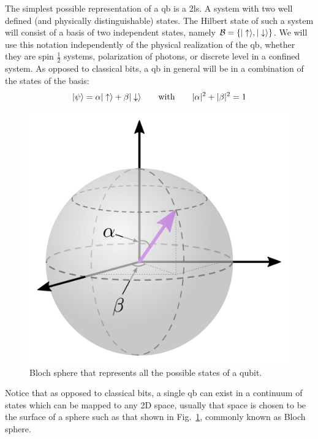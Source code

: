 
The simplest possible representation of a \ac{qb} is a \ac{2ls}. A system with two well defined (and physically distinguishable) states. The Hilbert state of such a system will consist of a basis of two independent states, namely $\mathcal{B}=\{|\uparrow\rangle,|\downarrow\rangle\}$. We will use this notation independently of the physical realization of the \ac{qb}, whether they are spin $\tfrac{1}{2}$ systems, polarization of photons, or discrete level in a confined system.
As opposed to classical bits, a \ac{qb} in general will be in a combination of the states of the basis:
\begin{equation}
  |\psi\rangle = \alpha|\uparrow\rangle + \beta|\downarrow\rangle \qquad\text{with}\qquad
  |\alpha|^2+|\beta|^2 =1
\label{genstate}
\end{equation}
\begin{figure}[!h]
\centering
\includegraphics{chapter02/figures/bloch_sphere.pdf}
\vspace{-5pt}
\caption{Bloch sphere that represents all the possible states of a qubit.}
\label{Bsph}
\end{figure}
\FloatBarrier
Notice that as opposed to classical bits, a single \ac{qb} can exist in a continuum of states which can be mapped to any 2D space, usually that space is chosen to be the surface of a sphere such as that shown in Fig.~\ref{Bsph}, commonly known as Bloch sphere.

